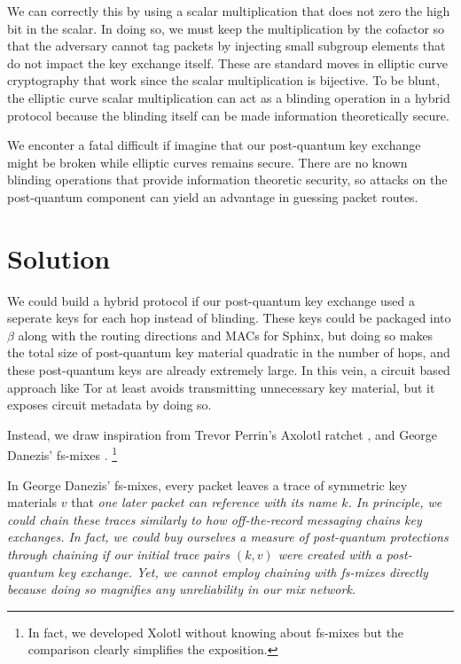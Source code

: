 \documentclass[twoside,letterpaper]{llncs}
\begin{document}
We can correctly this by using a scalar multiplication that does not
zero the high bit in the scalar.  In doing so, we must keep the
multiplication by the cofactor so that the adversary cannot tag
packets by injecting small subgroup elements that do not impact the
key exchange itself.  These are standard moves in elliptic curve 
cryptography that work since the scalar multiplication is bijective.
To be blunt, the elliptic curve scalar multiplication can act as
a blinding operation in a hybrid protocol because the blinding itself
can be made information theoretically secure.

We enconter a fatal difficult if imagine that our post-quantum key 
exchange might be broken while elliptic curves remains secure.  
There are no known blinding operations that provide information
theoretic security, so attacks on the post-quantum component can
yield an advantage in guessing packet routes.


\section{Solution}

We could build a hybrid protocol if our post-quantum key exchange
used a seperate keys for each hop instead of blinding.  These keys
could be packaged into $\beta$ along with the routing directions and
MACs for Sphinx, but doing so makes the total size of post-quantum 
key material quadratic in the number of hops, and these post-quantum
keys are already extremely large.
In this vein, a circuit based approach like Tor at least avoids
transmitting unnecessary key material, but it exposes circuit
metadata by doing so. 

Instead, we draw inspiration from Trevor Perrin's Axolotl ratchet
\cite{Axolotl}, and George Danezis' fs-mixes \cite{fs-mix}.
\footnote{In fact, we developed Xolotl without knowing about fs-mixes
but the comparison clearly simplifies the exposition.}


In George Danezis' fs-mixes, every packet leaves a trace of symmetric
key materials $v$ that \em{one} later packet can reference with its
name $k$.  In principle, we could chain these traces similarly to
how off-the-record messaging  chains key exchanges.
In fact, we could buy ourselves a measure of post-quantum protections
through chaining if our initial trace pairs $(k,v)$ were created with
a post-quantum key exchange.  Yet, we cannot employ chaining with
fs-mixes directly because doing so magnifies any unreliability in
our mix network. 
\end{document}

